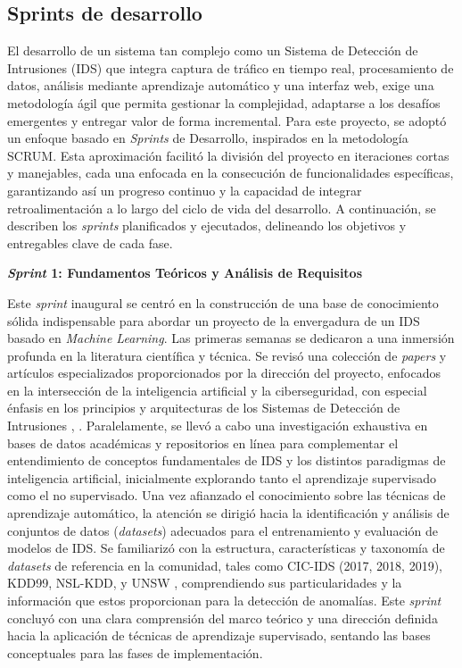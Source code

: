 \subsection{Sprints de desarrollo}\label{Sec.Sprints}
El desarrollo de un sistema tan complejo como un Sistema de Detección de Intrusiones (IDS) que integra captura de tráfico en tiempo real, procesamiento de datos, análisis mediante aprendizaje automático y una interfaz web, exige una metodología ágil que permita gestionar la complejidad, adaptarse a los desafíos emergentes y entregar valor de forma incremental. Para este proyecto, se adoptó un enfoque basado en \textit{Sprints} de Desarrollo, inspirados en la metodología SCRUM. Esta aproximación facilitó la división del proyecto en iteraciones cortas y manejables, cada una enfocada en la consecución de funcionalidades específicas, garantizando así un progreso continuo y la capacidad de integrar retroalimentación a lo largo del ciclo de vida del desarrollo. A continuación, se describen los \textit{sprints} planificados y ejecutados, delineando los objetivos y entregables clave de cada fase.


\textbf{\textit{Sprint} 1: Fundamentos Teóricos y Análisis de Requisitos}

Este \textit{sprint} inaugural se centró en la construcción de una base de conocimiento sólida indispensable para abordar un proyecto de la envergadura de un IDS basado en \textit{Machine Learning}. Las primeras semanas se dedicaron a una inmersión profunda en la literatura científica y técnica. Se revisó una colección de \textit{papers} y artículos especializados proporcionados por la dirección del proyecto, enfocados en la intersección de la inteligencia artificial y la ciberseguridad, con especial énfasis en los principios y arquitecturas de los Sistemas de Detección de Intrusiones \cite{Charmet2022XAI}, \cite{Zhang2022AICybersecurity}. Paralelamente, se llevó a cabo una investigación exhaustiva en bases de datos académicas y repositorios en línea para complementar el entendimiento de conceptos fundamentales de IDS y los distintos paradigmas de inteligencia artificial, inicialmente explorando tanto el aprendizaje supervisado como el no supervisado. Una vez afianzado el conocimiento sobre las técnicas de aprendizaje automático, la atención se dirigió hacia la identificación y análisis de conjuntos de datos (\textit{datasets}) adecuados para el entrenamiento y evaluación de modelos de IDS. Se familiarizó con la estructura, características y taxonomía de \textit{datasets} de referencia en la comunidad, tales como CIC-IDS (2017, 2018, 2019), KDD99, NSL-KDD, y UNSW \cite{PolaniaArias2021EvaluacionMLIDS}, comprendiendo sus particularidades y la información que estos proporcionan para la detección de anomalías. Este \textit{sprint} concluyó con una clara comprensión del marco teórico y una dirección definida hacia la aplicación de técnicas de aprendizaje supervisado, sentando las bases conceptuales para las fases de implementación.

